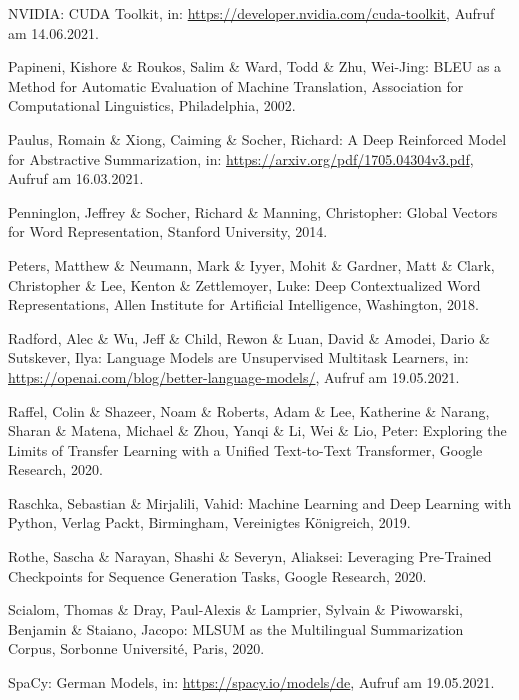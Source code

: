 \begin{thebibliography}{116}
NVIDIA: CUDA Toolkit, in: \url{https://developer.nvidia.com/cuda-toolkit}, Aufruf am 14.06.2021.

Papineni, Kishore \& Roukos, Salim \& Ward, Todd \& Zhu, Wei-Jing: BLEU as a Method for Automatic Evaluation of Machine Translation, Association for Computational Linguistics, Philadelphia, 2002.

Paulus, Romain \& Xiong, Caiming \& Socher, Richard: A Deep Reinforced Model for Abstractive Summarization, in: \url{https://arxiv.org/pdf/1705.04304v3.pdf}, Aufruf am 16.03.2021.

Penninglon, Jeffrey \& Socher, Richard \& Manning, Christopher: Global Vectors for Word Representation, Stanford University, 2014.

Peters, Matthew \& Neumann, Mark \& Iyyer, Mohit \& Gardner, Matt \& Clark, Christopher \& Lee, Kenton \& Zettlemoyer, Luke: Deep Contextualized Word Representations, Allen Institute for Artificial Intelligence, Washington, 2018.

Radford, Alec \& Wu, Jeff \& Child, Rewon \& Luan, David \& Amodei, Dario \& Sutskever, Ilya: Language Models are Unsupervised Multitask Learners, in: \url{https://openai.com/blog/better-language-models/}, Aufruf am 19.05.2021.

Raffel, Colin \& Shazeer, Noam \& Roberts, Adam \& Lee, Katherine \& Narang, Sharan \& Matena, Michael \& Zhou, Yanqi \& Li, Wei \& Lio, Peter: Exploring the Limits of Transfer Learning with a Unified Text-to-Text Transformer, Google Research, 2020.

Raschka, Sebastian \& Mirjalili, Vahid: Machine Learning and Deep Learning with Python, Verlag Packt, Birmingham, Vereinigtes Königreich, 2019.

Rothe, Sascha \& Narayan, Shashi \& Severyn, Aliaksei: Leveraging Pre-Trained Checkpoints for Sequence Generation Tasks, Google Research, 2020.

Scialom, Thomas \& Dray, Paul-Alexis \& Lamprier, Sylvain \& Piwowarski, Benjamin \& Staiano, Jacopo: MLSUM as the Multilingual Summarization Corpus, Sorbonne Université, Paris, 2020.

SpaCy: German Models, in: \url{https://spacy.io/models/de}, Aufruf am 19.05.2021.


\end{thebibliography}
